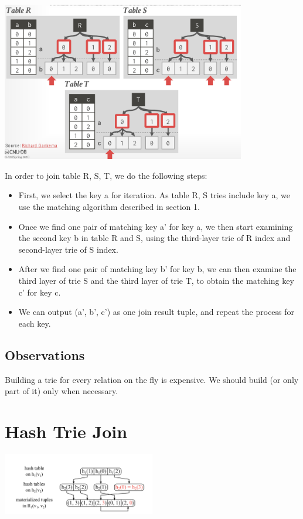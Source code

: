 \documentclass[11pt]{article}
\begin{document}
\begin{center}
    \includegraphics[width=0.8\textwidth]{img/figure2.png}
\end{center}

In order to join table R, S, T, we do the following steps:

\begin{itemize}
    \item First, we select the key a for iteration. As table R, S tries include key a, we use the matching algorithm
          described in section 1.
    \item Once we find one pair of matching key a' for key a, we then start examining the second key b in table R and S,
          using the third-layer trie of R index and second-layer trie of S index.
    \item After we find one pair of matching key b' for key b, we can then examine the third layer of trie S and the
          third layer of trie T, to obtain the matching key c' for key c.
    \item We can output (a', b', c') as one join result tuple, and repeat the process for each key.
\end{itemize}

\subsection{Observations}

Building a trie for every relation on the fly is expensive. We should build (or only part of it) only when necessary.

\section{Hash Trie Join}

\begin{center}
    \includegraphics[width=0.5\textwidth]{img/figure3.png}
\end{center}
\end{document}
